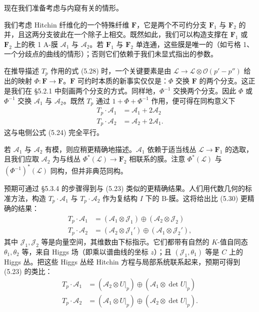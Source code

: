 \documentclass[11pt,a4paper]{article}
\begin{document}
现在我们准备考虑与内窥有关的情形。

我们考虑 Hitchin 纤维化的一个特殊纤维 $\boldsymbol{F}$，它是两个不可约分支 $\boldsymbol{F}_1$ 与 $\boldsymbol{F}_2$ 的并，且这两分支彼此在一个除子上相交。既然如此，我们可以构造支撑在 $\boldsymbol{F}_1$ 或 $\boldsymbol{F}_2$ 上的秩 1 A-膜 $\mathcal{A}_1$ 与 $\mathcal{A}_2$。若 $\boldsymbol{F}_1$ 与 $\boldsymbol{F}_2$ 单连通，这些膜是唯一的（如亏格 1、一个分歧点的曲线的情形）；否则它们依赖于我们未显式指出的参数。

在推导描述 $T_p$ 作用的式 (5.28) 时，一个关键要素是由 $\mathcal{L}\to\mathcal{L}\otimes\mathcal{O}(p'-p'')$ 给出的映射 $\Phi:\boldsymbol{F}\to\boldsymbol{F}$。$\boldsymbol{F}$ 可约时本质的新事实仅仅是：$\Phi$ 交换 $\boldsymbol{F}$ 的两个分支。这正是我们在 §5.2.1 中刻画两个分支的方式。同样地，$\Phi^{-1}$ 交换两个分支。因此 $\Phi$ 或 $\Phi^{-1}$ 交换 $\mathcal{A}_1$ 与 $\mathcal{A}_2$。既然 $T_p$ 通过 $1+\Phi+\Phi^{-1}$ 作用，便可得在同构意义下
\begin{equation}\tag{5.30}
\begin{aligned}
T_p\cdot\mathcal{A}_1 &= \mathcal{A}_1+2\mathcal{A}_2\\
T_p\cdot\mathcal{A}_2 &= \mathcal{A}_2+2\mathcal{A}_1.
\end{aligned}
\end{equation}
这与电侧公式 (5.24) 完全平行。

若 $\mathcal{A}_1$ 与 $\mathcal{A}_2$ 有模，则应稍更精确地描述。$\mathcal{A}_1$ 依赖于适当线丛 $\mathcal{L}\to\boldsymbol{F}_1$ 的选取，且我们应取 $\mathcal{A}_2$ 为与线丛 $\Phi^*(\mathcal{L})\to\boldsymbol{F}_2$ 相联系的膜。注意 $\Phi^*(\mathcal{L})$ 与 $(\Phi^{-1})^*(\mathcal{L})$ 同构，但并非典范同构。

预期可通过 §5.3.4 的步骤得到与 (5.23) 类似的更精确结果。人们用代数几何的标准方法，构造 $T_p\cdot\mathcal{A}_1$ 与 $T_p\cdot\mathcal{A}_2$ 作为复结构 $I$ 下的 B-膜。这将给出比
(5.30) 更精确的结果：
\begin{equation}\tag{5.31}
\begin{aligned}
T_p\cdot\mathcal{A}_1 &= (\mathcal{A}_1\otimes\mathcal{J}_1)\oplus(\mathcal{A}_2\otimes\mathcal{J}_2)\\
T_p\cdot\mathcal{A}_2 &= (\mathcal{A}_2\otimes\mathcal{J}_1')\oplus(\mathcal{A}_1\otimes\mathcal{J}_2'),
\end{aligned}
\end{equation}
其中 $\mathcal{J}_1,\mathcal{J}_2$ 等是向量空间，其维数由下标指示。它们都带有自然的 $K$-值自同态 $\theta_1,\theta_2$ 等，来自 Higgs 场（即乘以谱曲线的坐标 $z$）；且 $(\mathcal{J}_1,\theta_1)$ 等是 $C$ 上的 Higgs 丛。把这些 Higgs 丛经 Hitchin 方程与局部系统联系起来，预期可得到 (5.23) 的类比：
\begin{equation}\tag{5.32}
\begin{aligned}
T_p\cdot\mathcal{A}_1 &= (\mathcal{A}_2\otimes U|_p)\oplus(\mathcal{A}_1\otimes\det U|_p)\\
T_p\cdot\mathcal{A}_2 &= (\mathcal{A}_1\otimes U|_p)\oplus(\mathcal{A}_2\otimes\det U|_p).
\end{aligned}
\end{equation}
\end{document}
